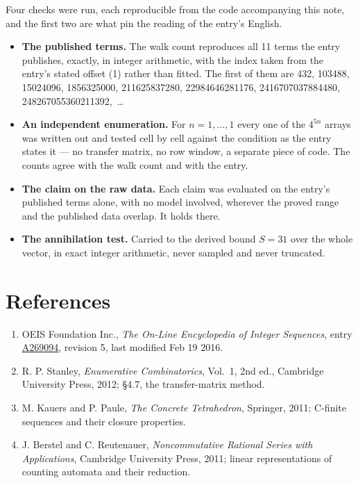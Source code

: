 \documentclass[11pt]{article}
\theoremstyle{definition}
\begin{document}
Four checks were run, each reproducible from the code accompanying this note, and the first two are what pin the reading of the entry's English.

\begin{itemize}

\item {\bfseries The published terms.} The walk count reproduces all 11 terms the entry publishes, exactly, in integer arithmetic, with the index taken from the entry's stated offset (1) rather than fitted. The first of them are 432, 103488, 15024096, 1856325000, 211625837280, 22984646281176, 2416707037884480, 248267055360211392,~\dots

\item {\bfseries An independent enumeration.} For $n = 1,\dots,1$ every one of the $4^{5n}$ arrays was written out and tested cell by cell against the condition as the entry states it --- no transfer matrix, no row window, a separate piece of code. The counts agree with the walk count and with the entry.

\item {\bfseries The claim on the raw data.} Each claim was evaluated on the entry's published terms alone, with no model involved, wherever the proved range and the published data overlap. It holds there.

\item {\bfseries The annihilation test.} Carried to the derived bound $S = 31$ over the whole vector, in exact integer arithmetic, never sampled and never truncated.

\end{itemize}

\section{References}

\begin{enumerate}

\item OEIS Foundation Inc., \emph{The On-Line Encyclopedia of Integer Sequences}, entry \href{https://oeis.org/A269094}{A269094}, revision 5, last modified Feb 19 2016.

\item R. P. Stanley, \emph{Enumerative Combinatorics}, Vol.~1, 2nd ed., Cambridge University Press, 2012; \S4.7, the transfer-matrix method.

\item M. Kauers and P. Paule, \emph{The Concrete Tetrahedron}, Springer, 2011; C-finite sequences and their closure properties.

\item J. Berstel and C. Reutenauer, \emph{Noncommutative Rational Series with Applications}, Cambridge University Press, 2011; linear representations of counting automata and their reduction.

\end{enumerate}
\end{document}
